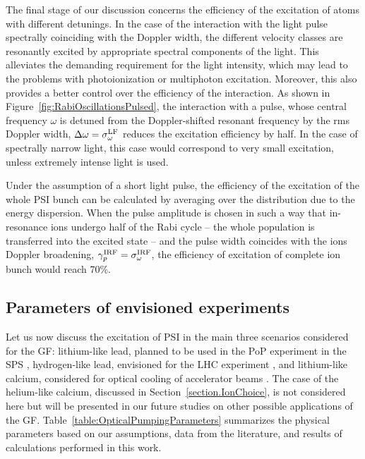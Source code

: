 The final stage of our discussion concerns the efficiency of the excitation of atoms with different detunings.  In the case of the interaction with the light pulse spectrally coinciding with the Doppler width, the different velocity classes are resonantly excited by appropriate spectral components of the light.  This alleviates the demanding requirement for the light intensity, which may lead to the problems with photoionization or multiphoton excitation.  Moreover, this also provides a better control over the efficiency of the interaction. As shown in Figure~\ref{fig:RabiOscillationsPulsed}, the interaction with a pulse, whose central frequency $\omega$ is detuned from the Doppler-shifted resonant frequency by the rms Doppler width, $\Delta\omega=\sigma_\omega^{\rm LF}$ reduces the excitation efficiency by half. In the case of spectrally narrow light, this case would correspond to very small excitation, unless extremely intense light is used. 

Under the assumption of a short light pulse, the efficiency of the excitation of the whole PSI bunch can be calculated by averaging over the distribution due to the energy dispersion. When the pulse amplitude is chosen in such a way that in-resonance ions undergo half of the Rabi cycle -- the whole population is transferred into the excited state -- and the pulse width coincides with the ions Doppler broadening, $\gamma_p^{\rm IRF}=\sigma_\omega^{\rm IRF}$, the efficiency of excitation of complete ion bunch would reach 70\%.

\subsection{Parameters of envisioned experiments}

Let us now discuss the excitation of PSI in the main three scenarios considered for the GF: lithium-like lead, planned to be used in the PoP experiment in the SPS \cite{GF-PoP-LoI:2019}, hydrogen-like lead, envisioned for the LHC experiment \cite{Bessonov:1995hd}, and lithium-like calcium, considered for optical cooling of accelerator beams \cite{Krasny:2020wgx}.  
The case of the helium-like calcium, discussed in Section~\ref{section.IonChoice},
is not considered here but will be presented in our future studies on other possible applications of the GF.
Table~\ref{table:OpticalPumpingParameters} summarizes the physical parameters based on our assumptions, data from the literature, and results of calculations performed in this work.

